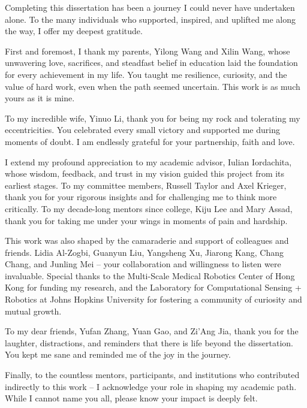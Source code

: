 
Completing this dissertation has been a journey I could never have undertaken alone. To the many individuals who supported, inspired, and uplifted me along the way, I offer my deepest gratitude.

First and foremost, I thank my parents, Yilong Wang and Xilin Wang, whose unwavering love, sacrifices, and steadfast belief in education laid the foundation for every achievement in my life. You taught me resilience, curiosity, and the value of hard work, even when the path seemed uncertain. This work is as much yours as it is mine.

To my incredible wife, Yinuo Li, thank you for being my rock and tolerating my eccentricities. You celebrated every small victory and supported me during moments of doubt. I am endlessly grateful for your partnership, faith and love.

I extend my profound appreciation to my academic advisor, Iulian Iordachita, whose wisdom, feedback, and trust in my vision guided this project from its earliest stages. To my committee members, Russell Taylor and Axel Krieger, thank you for your rigorous insights and for challenging me to think more critically. To my decade-long mentors since college, Kiju Lee and Mary Assad, thank you for taking me under your wings in moments of pain and hardship.

This work was also shaped by the camaraderie and support of colleagues and friends. Lidia Al-Zogbi, Guanyun Liu, Yangsheng Xu, Jiarong Kang, Chang Chang, and Junling Mei -- your collaboration and willingness to listen were invaluable. Special thanks to the Multi-Scale Medical Robotics Center of Hong Kong for funding my research, and the Laboratory for Computational Sensing + Robotics at Johns Hopkins University for fostering a community of curiosity and mutual growth.

To my dear friends, Yufan Zhang, Yuan Gao, and Zi'Ang Jia, thank you for the laughter, distractions, and reminders that there is life beyond the dissertation. You kept me sane and reminded me of the joy in the journey.

Finally, to the countless mentors, participants, and institutions who contributed indirectly to this work -- I acknowledge your role in shaping my academic path. While I cannot name you all, please know your impact is deeply felt.
